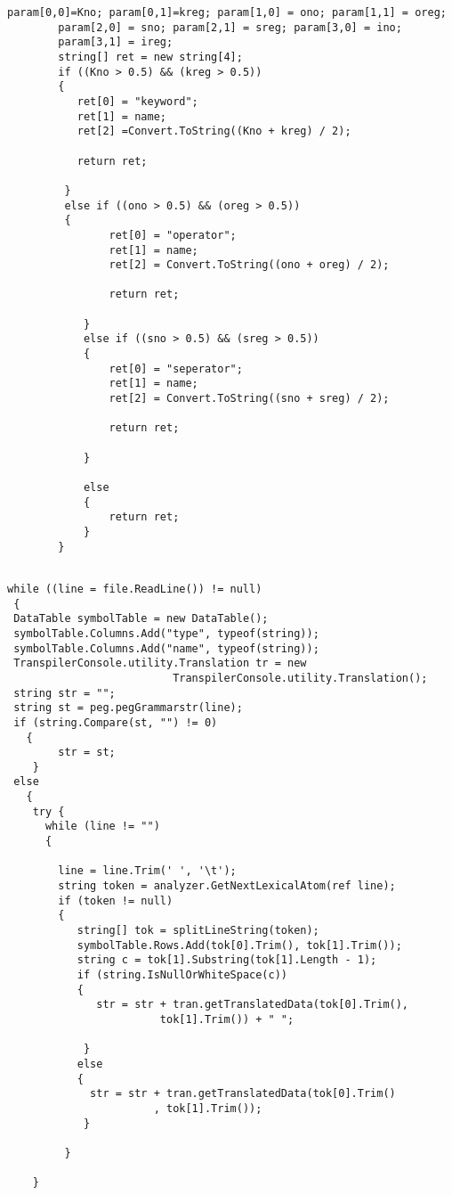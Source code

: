 \documentclass[23pt]{article}
\begin{document}
\begin{lstlisting}[label=some-code,caption= Code for training the system]
        param[0,0]=Kno; param[0,1]=kreg; param[1,0] = ono; param[1,1] = oreg;  
        param[2,0] = sno; param[2,1] = sreg; param[3,0] = ino;
        param[3,1] = ireg;
        string[] ret = new string[4];
        if ((Kno > 0.5) && (kreg > 0.5))
        {
           ret[0] = "keyword";
           ret[1] = name;
           ret[2] =Convert.ToString((Kno + kreg) / 2);

           return ret;
                
         }
         else if ((ono > 0.5) && (oreg > 0.5))
         {
                ret[0] = "operator";
                ret[1] = name;
                ret[2] = Convert.ToString((ono + oreg) / 2);

                return ret;

            }
            else if ((sno > 0.5) && (sreg > 0.5))
            {
                ret[0] = "seperator";
                ret[1] = name;
                ret[2] = Convert.ToString((sno + sreg) / 2);

                return ret;

            }

            else
            {
                return ret;
            }
        }

\end{lstlisting}

\begin{lstlisting}[label=some-code,caption= Reading the tokens from the file]

while ((line = file.ReadLine()) != null)
 {
 DataTable symbolTable = new DataTable();
 symbolTable.Columns.Add("type", typeof(string));
 symbolTable.Columns.Add("name", typeof(string));
 TranspilerConsole.utility.Translation tr = new 
                          TranspilerConsole.utility.Translation();
 string str = "";
 string st = peg.pegGrammarstr(line);
 if (string.Compare(st, "") != 0)
   {
        str = st;
    }
 else
   {
    try {
      while (line != "")
      {

        line = line.Trim(' ', '\t');
        string token = analyzer.GetNextLexicalAtom(ref line);
        if (token != null)
        {
           string[] tok = splitLineString(token);             
           symbolTable.Rows.Add(tok[0].Trim(), tok[1].Trim());
           string c = tok[1].Substring(tok[1].Length - 1);      
           if (string.IsNullOrWhiteSpace(c))
           {
              str = str + tran.getTranslatedData(tok[0].Trim(),
                        tok[1].Trim()) + " ";

            }
           else
           {
             str = str + tran.getTranslatedData(tok[0].Trim()
                       , tok[1].Trim());
            }

         }

    }                  

\end{lstlisting}
\end{document}
